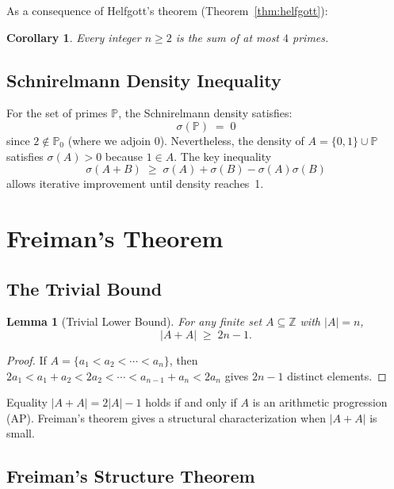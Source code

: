 \documentclass[12pt,a4paper]{amsart}
\newtheorem{lemma}[theorem]{Lemma}
\newtheorem{corollary}[theorem]{Corollary}
\theoremstyle{definition}
\newcommand{\Z}{\mathbb{Z}}
\newcommand{\abs}[1]{\left|#1\right|}
\begin{document}
As a consequence of Helfgott's theorem (Theorem~\ref{thm:helfgott}):
\begin{corollary}
Every integer $n \geq 2$ is the sum of at most $4$ primes.
\end{corollary}

\subsection{Schnirelmann Density Inequality}

For the set of primes $\mathbb{P}$, the Schnirelmann density satisfies:
\[
  \sigma(\mathbb{P}) \;=\; 0
\]
since $2 \notin \mathbb{P}_0$ (where we adjoin $0$).  Nevertheless,
the density of $A = \{0,1\} \cup \mathbb{P}$ satisfies $\sigma(A) > 0$
because $1 \in A$.  The key inequality
\[
  \sigma(A + B) \;\geq\; \sigma(A) + \sigma(B) - \sigma(A)\sigma(B)
\]
allows iterative improvement until density reaches~1.

\section{Freiman's Theorem}\label{sec:freiman}

\subsection{The Trivial Bound}

\begin{lemma}[Trivial Lower Bound]\label{lem:trivial}
For any finite set $A \subseteq \Z$ with $\abs{A} = n$,
\[
  \abs{A + A} \;\geq\; 2n - 1.
\]
\end{lemma}

\begin{proof}
If $A = \{a_1 < a_2 < \cdots < a_n\}$, then
$2a_1 < a_1 + a_2 < 2a_2 < \cdots < a_{n-1} + a_n < 2a_n$
gives $2n - 1$ distinct elements.
\end{proof}

Equality $\abs{A + A} = 2\abs{A} - 1$ holds if and only if $A$ is an
arithmetic progression (AP).  Freiman's theorem gives a structural
characterization when $\abs{A + A}$ is small.

\subsection{Freiman's Structure Theorem}
\end{document}
